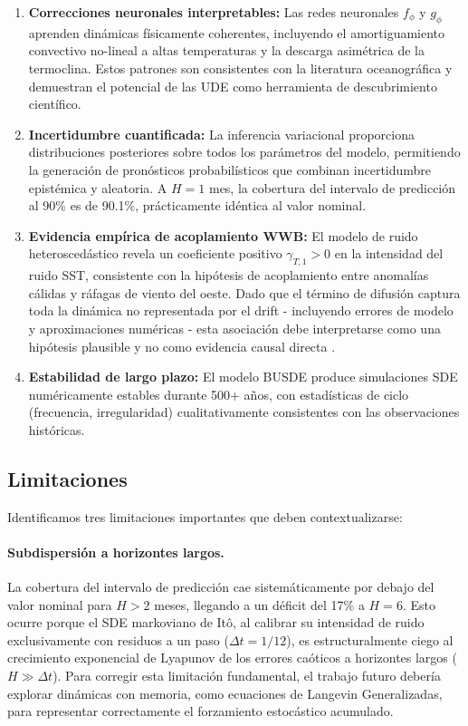 \documentclass[11pt,a4paper]{article}
\begin{document}
\begin{enumerate}
  \item \textbf{Correcciones neuronales interpretables:} Las redes neuronales $f_\phi$ y $g_\phi$ aprenden dinámicas físicamente coherentes, incluyendo el amortiguamiento convectivo no-lineal a altas temperaturas y la descarga asimétrica de la termoclina. Estos patrones son consistentes con la literatura oceanográfica y demuestran el potencial de las UDE como herramienta de descubrimiento científico.

  \item \textbf{Incertidumbre cuantificada:} La inferencia variacional proporciona distribuciones posteriores sobre todos los parámetros del modelo, permitiendo la generación de pronósticos probabilísticos que combinan incertidumbre epistémica y aleatoria. A $H = 1$ mes, la cobertura del intervalo de predicción al 90\% es de 90.1\%, prácticamente idéntica al valor nominal.

  \item \textbf{Evidencia empírica de acoplamiento WWB:} El modelo de ruido heteroscedástico revela un coeficiente positivo $\gamma_{T,1} > 0$ en la intensidad del ruido SST, consistente con la hipótesis de acoplamiento entre anomalías cálidas y ráfagas de viento del oeste. Dado que el término de difusión captura toda la dinámica no representada por el drift - incluyendo errores de modelo y aproximaciones numéricas - esta asociación debe interpretarse como una hipótesis plausible y no como evidencia causal directa \citep{eisenman2005}.

  \item \textbf{Estabilidad de largo plazo:} El modelo BUSDE produce simulaciones SDE numéricamente estables durante 500+ años, con estadísticas de ciclo (frecuencia, irregularidad) cualitativamente consistentes con las observaciones históricas.
\end{enumerate}

\subsection{Limitaciones}

Identificamos tres limitaciones importantes que deben contextualizarse:

\paragraph{Subdispersión a horizontes largos.} La cobertura del intervalo de predicción cae sistemáticamente por debajo del valor nominal para $H > 2$ meses, llegando a un déficit del 17\% a $H = 6$. Esto ocurre porque el SDE markoviano de Itô, al calibrar su intensidad de ruido exclusivamente con residuos a un paso ($\Delta t = 1/12$), es estructuralmente ciego al crecimiento exponencial de Lyapunov de los errores caóticos a horizontes largos ($H \gg \Delta t$). Para corregir esta limitación fundamental, el trabajo futuro debería explorar dinámicas con memoria, como ecuaciones de Langevin Generalizadas, para representar correctamente el forzamiento estocástico acumulado.
\end{document}
